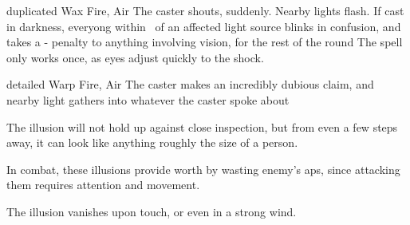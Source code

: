   {duplicated}%
  {Wax}%
  {Fire, Air}%
  {}%
  {The caster shouts, suddenly.
  Nearby lights flash.
  If cast in darkness, everyong within \spellRange\ of an affected light source blinks in confusion, and takes a - penalty to anything involving vision, for the rest of the round}%
  {The spell only works once, as eyes adjust quickly to the shock.}

  {detailed}%
  {Warp}%
  {Fire, Air}%
  {}%
  {The caster makes an incredibly dubious claim, and nearby light gathers into whatever the caster spoke about}%
  {The illusion will not hold up against close inspection, but from even a few steps away, it can look like anything roughly the size of a person.

  In combat, these illusions provide worth by wasting enemy's \glspl{ap}, since attacking them requires attention and movement.

  The illusion vanishes upon touch, or even in a strong wind.}

